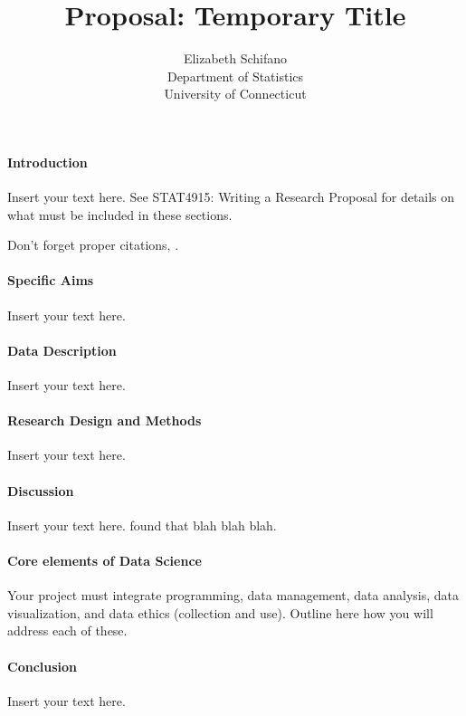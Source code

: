 \documentclass[12pt]{article}
\title{Proposal: Temporary Title}
\author{Elizabeth Schifano\\
  Department of Statistics\\
  University of Connecticut
}
\begin{document}
\maketitle


\paragraph{Introduction}
Insert your text here. See STAT4915: Writing a Research Proposal for details on 
what must be included in these sections.

Don't forget proper citations, \citep[e.g.,][]{dwivedi2017analysis}.


\paragraph{Specific Aims}
Insert your text here.


\paragraph{Data Description}
Insert your text here.


\paragraph{Research Design and Methods}
Insert your text here.


\paragraph{Discussion}
Insert your text here. \citet{wild2004global} found that blah blah blah.


\paragraph{Core elements of Data Science}
Your project must integrate programming, data management,
data analysis, data visualization, and data ethics (collection and use).  
Outline here how you will address each of these.  


\paragraph{Conclusion}
Insert your text here.




\end{document}
